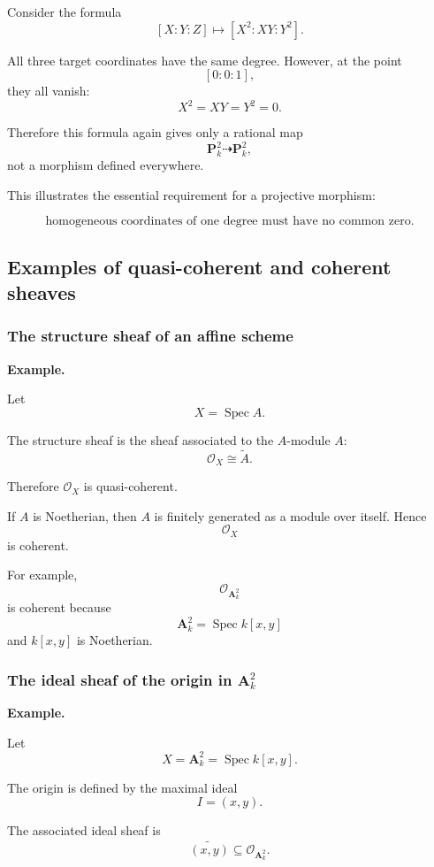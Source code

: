 Consider the formula
\[
[X:Y:Z]
\longmapsto
[X^2:XY:Y^2].
\]

All three target coordinates have the same degree. However, at the point
\[
[0:0:1],
\]
they all vanish:
\[
X^2=XY=Y^2=0.
\]

Therefore this formula again gives only a rational map
\[
\mathbf P^2_k\dashrightarrow\mathbf P^2_k,
\]
not a morphism defined everywhere.

This illustrates the essential requirement for a projective morphism:

\[
\boxed{
	\text{homogeneous coordinates of one degree must have no common zero.}
}
\]

\subsection{Examples of quasi-coherent and coherent sheaves}

\subsubsection{The structure sheaf of an affine scheme}

\textbf{Example.}

Let
\[
X=\operatorname{Spec}A.
\]

The structure sheaf is the sheaf associated to the \(A\)-module \(A\):
\[
\mathcal O_X\cong\widetilde A.
\]

Therefore \(\mathcal O_X\) is quasi-coherent.

If \(A\) is Noetherian, then \(A\) is finitely generated as a module over itself. Hence
\[
\mathcal O_X
\]
is coherent.

For example,
\[
\mathcal O_{\mathbf A^2_k}
\]
is coherent because
\[
\mathbf A^2_k=\operatorname{Spec}k[x,y]
\]
and \(k[x,y]\) is Noetherian.

\subsubsection{The ideal sheaf of the origin in \(\mathbf A^2_k\)}

\textbf{Example.}

Let
\[
X=\mathbf A^2_k=\operatorname{Spec}k[x,y].
\]

The origin is defined by the maximal ideal
\[
I=(x,y).
\]

The associated ideal sheaf is
\[
\widetilde{(x,y)}\subseteq\mathcal O_{\mathbf A^2_k}.
\]

